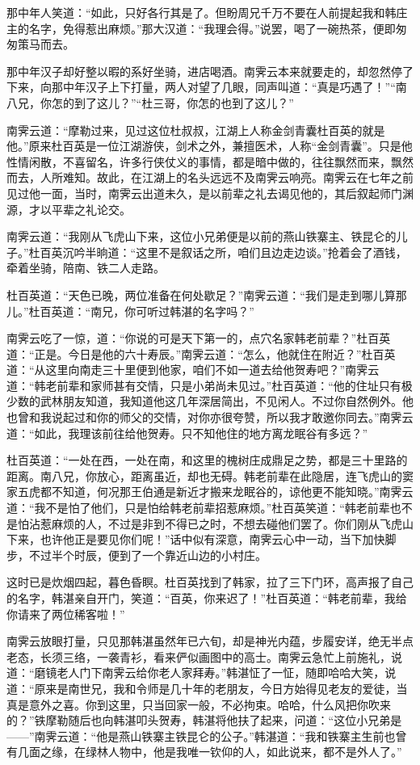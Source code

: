 \documentclass[12pt,oneside]{book}
\begin{document}
那中年人笑道：``如此，只好各行其是了。但盼周兄千万不要在人前提起我和韩庄主的名字，免得惹出麻烦。''那大汉道：``我理会得。''说罢，喝了一碗热茶，便即匆匆策马而去。

那中年汉子却好整以暇的系好坐骑，进店喝酒。南霁云本来就要走的，却忽然停了下来，向那中年汉子上下打量，两人对望了几眼，同声叫道：``真是巧遇了！''``南八兄，你怎的到了这儿？''``杜三哥，你怎的也到了这儿？''

南霁云道：``摩勒过来，见过这位杜叔叔，江湖上人称金剑青囊杜百英的就是他。''原来杜百英是一位江湖游侠，剑术之外，兼擅医术，人称``金剑青囊''。只是他性情闲散，不喜留名，许多行侠仗义的事情，都是暗中做的，往往飘然而来，飘然而去，人所难知。故此，在江湖上的名头远远不及南霁云响亮。南霁云在七年之前见过他一面，当时，南霁云出道未久，是以前辈之礼去谒见他的，其后叙起师门渊源，才以平辈之礼论交。

南霁云道：``我刚从飞虎山下来，这位小兄弟便是以前的燕山铁寨主、铁昆仑的儿子。''杜百英沉吟半晌道：``这里不是叙话之所，咱们且边走边谈。''抢着会了酒钱，牵着坐骑，陪南、铁二人走路。

杜百英道：``天色已晚，两位准备在何处歇足？''南霁云道：``我们是走到哪儿算那儿。''杜百英道：``南兄，你可听过韩湛的名字吗？''

南霁云吃了一惊，道：``你说的可是天下第一的，点穴名家韩老前辈？''杜百英道：``正是。今日是他的六十寿辰。''南霁云道：``怎么，他就住在附近？''杜百英道：``从这里向南走三十里便到他家，咱们不如一道去给他贺寿吧？''南霁云道：``韩老前辈和家师甚有交情，只是小弟尚未见过。''杜百英道：``他的住址只有极少数的武林朋友知道，我知道他这几年深居简出，不见闲人。不过你自然例外。他也曾和我说起过和你的师父的交情，对你亦很夸赞，所以我才敢邀你同去。''南霁云道：``如此，我理该前往给他贺寿。只不知他住的地方离龙眠谷有多远？''

杜百英道：``一处在西，一处在南，和这里的槐树庄成鼎足之势，都是三十里路的距离。南八兄，你放心，距离虽近，却也无碍。韩老前辈在此隐居，连飞虎山的窦家五虎都不知道，何况那王伯通是新近才搬来龙眠谷的，谅他更不能知晓。''南霁云道：``我不是怕了他们，只是怕给韩老前辈招惹麻烦。''杜百英笑道：``韩老前辈也不是怕沾惹麻烦的人，不过是非到不得已之时，不想去碰他们罢了。你们刚从飞虎山下来，也许他正是要见你们呢！''话中似有深意，南霁云心中一动，当下加快脚步，不过半个时辰，便到了一个靠近山边的小村庄。

这时已是炊烟四起，暮色昏瞑。杜百英找到了韩家，拉了三下门环，高声报了自己的名字，韩湛亲自开门，笑道：``百英，你来迟了！''杜百英道：``韩老前辈，我给你请来了两位稀客啦！''

南霁云放眼打量，只见那韩湛虽然年已六旬，却是神光内蕴，步履安详，绝无半点老态，长须三络，一袭青衫，看来俨似画图中的高士。南霁云急忙上前施礼，说道：``磨镜老人门下南霁云给你老人家拜寿。''韩湛怔了一怔，随即哈哈大笑，说道：``原来是南世兄，我和令师是几十年的老朋友，今日方始得见老友的爱徒，当真是意外之喜。你到这里，只当回家一般，不必拘束。哈哈，什么风把你吹来的？''铁摩勒随后也向韩湛叩头贺寿，韩湛将他扶了起来，问道：``这位小兄弟是------''南霁云道：``他是燕山铁寨主铁昆仑的公子。''韩湛道：``我和铁寨主生前也曾有几面之缘，在绿林人物中，他是我唯一钦仰的人，如此说来，都不是外人了。''
\end{document}
